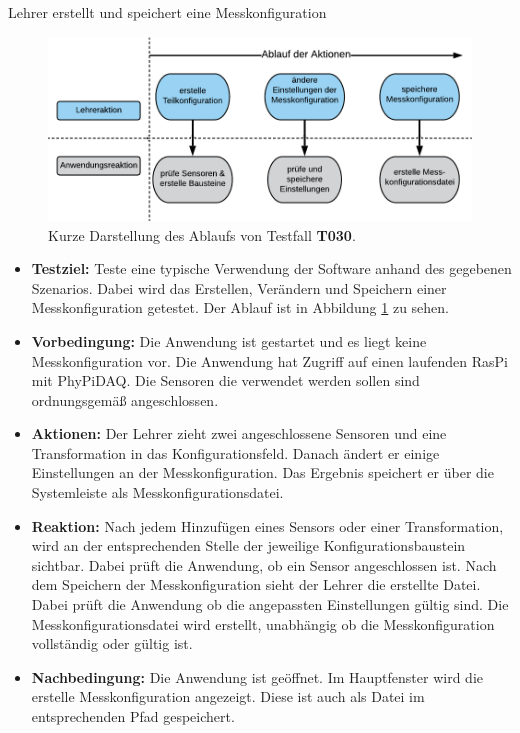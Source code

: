 \documentclass[parskip=full]{scrartcl}
\begin{document}
\begin{description}
\begin{itemize}
\end{itemize}



\hypertarget{link-t030}{\item[T030]} Lehrer erstellt und speichert eine Messkonfiguration

\begin{figure}[htbp]
	\begin{center}
		\includegraphics[width = 13cm]{Grafik/T030-Ablauf.png}
		\caption{Kurze Darstellung des Ablaufs von Testfall \textbf{T030}.}
		\label{T030-Ablauf}
	\end{center}
\end{figure}




\begin{itemize}

\item []\textbf{Testziel:} Teste eine typische Verwendung der Software anhand des gegebenen Szenarios. Dabei wird das Erstellen, Verändern und Speichern einer Messkonfiguration getestet. Der Ablauf ist in Abbildung \ref{T030-Ablauf} zu sehen.

\item []\textbf{Vorbedingung:} Die Anwendung ist gestartet und es liegt keine Messkonfiguration vor. Die Anwendung hat Zugriff auf einen laufenden \gls{RasPi} mit \gls{PhyPiDAQ}. Die Sensoren die verwendet werden sollen sind ordnungsgemäß angeschlossen.
\item []\textbf{Aktionen:} Der Lehrer zieht zwei angeschlossene Sensoren und eine Transformation in das Konfigurationsfeld. Danach ändert er einige Einstellungen an der Messkonfiguration. Das Ergebnis speichert er über die Systemleiste als Messkonfigurationsdatei.
\item []\textbf{Reaktion:} Nach jedem Hinzufügen eines Sensors oder einer Transformation, wird an der entsprechenden Stelle der jeweilige Konfigurationsbaustein sichtbar. Dabei prüft die Anwendung, ob ein Sensor angeschlossen ist. Nach dem Speichern der Messkonfiguration sieht der Lehrer die erstellte Datei. Dabei prüft die Anwendung ob die angepassten Einstellungen gültig sind. Die Messkonfigurationsdatei wird erstellt, unabhängig ob die Messkonfiguration vollständig oder gültig ist.
\item []\textbf{Nachbedingung:}  Die Anwendung ist geöffnet. Im Hauptfenster wird die erstelle Messkonfiguration angezeigt. Diese ist auch als Datei im entsprechenden Pfad gespeichert.


\end{itemize}
\end{description}
\end{document}
